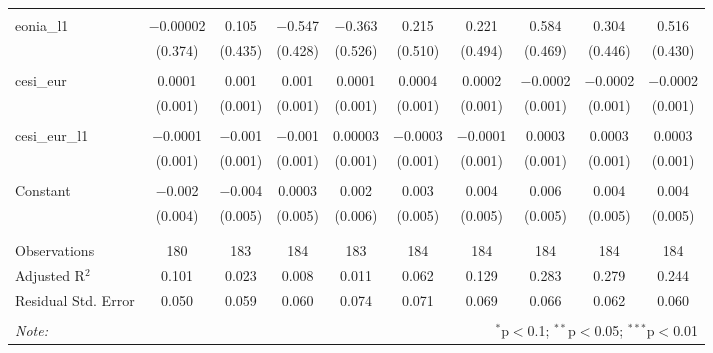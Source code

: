 \begin{table}[!htbp]
\begin{adjustbox}{width=1.35\textwidth}
\begin{tabular}{@{\extracolsep{5pt}}lccccccccc}
  & & & & & & & & & \\ 
 eonia\_l1 & $-$0.00002 & 0.105 & $-$0.547 & $-$0.363 & 0.215 & 0.221 & 0.584 & 0.304 & 0.516 \\ 
  & (0.374) & (0.435) & (0.428) & (0.526) & (0.510) & (0.494) & (0.469) & (0.446) & (0.430) \\ 
  & & & & & & & & & \\ 
 cesi\_eur & 0.0001 & 0.001 & 0.001 & 0.0001 & 0.0004 & 0.0002 & $-$0.0002 & $-$0.0002 & $-$0.0002 \\ 
  & (0.001) & (0.001) & (0.001) & (0.001) & (0.001) & (0.001) & (0.001) & (0.001) & (0.001) \\ 
  & & & & & & & & & \\ 
 cesi\_eur\_l1 & $-$0.0001 & $-$0.001 & $-$0.001 & 0.00003 & $-$0.0003 & $-$0.0001 & 0.0003 & 0.0003 & 0.0003 \\ 
  & (0.001) & (0.001) & (0.001) & (0.001) & (0.001) & (0.001) & (0.001) & (0.001) & (0.001) \\ 
  & & & & & & & & & \\ 
 Constant & $-$0.002 & $-$0.004 & 0.0003 & 0.002 & 0.003 & 0.004 & 0.006 & 0.004 & 0.004 \\ 
  & (0.004) & (0.005) & (0.005) & (0.006) & (0.005) & (0.005) & (0.005) & (0.005) & (0.005) \\ 
  & & & & & & & & & \\ 
\hline \\[-1.8ex] 
Observations & 180 & 183 & 184 & 183 & 184 & 184 & 184 & 184 & 184 \\ 
Adjusted R$^{2}$ & 0.101 & 0.023 & 0.008 & 0.011 & 0.062 & 0.129 & 0.283 & 0.279 & 0.244 \\ 
Residual Std. Error & 0.050 & 0.059 & 0.060 & 0.074 & 0.071 & 0.069 & 0.066 & 0.062 & 0.060 \\ 
\hline 
\hline \\[-1.8ex] 
\textit{Note:}  & \multicolumn{9}{r}{$^{*}$p$<$0.1; $^{**}$p$<$0.05; $^{***}$p$<$0.01} \\ 
\end{tabular} 
\end{adjustbox}
\end{table} 
